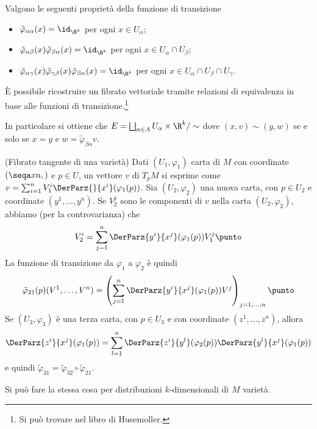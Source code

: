 \begin{proposition}
	Valgono le seguenti proprietà della funzione di transizione
	\begin{itemize}
	 \item $\tilde\varphi_{\alpha\alpha}(x)=\id_{\R^k}$ per ogni $x\in U_\alpha$;
	 \item $\tilde\varphi_{\alpha\beta}(x)\tilde\varphi_{\beta\alpha}(x) = \id_{\R^k}$ per ogni $x\in U_\alpha\cap U_\beta$;
	 \item $\tilde\varphi_{\alpha\gamma}(x) \tilde\varphi_{\gamma\beta}(x) \tilde\varphi_{\beta\alpha}(x) = \id_{\R^k}$ per ogni $x\in U_\alpha\cap U_\beta \cap U_\gamma$.
	\end{itemize}
\end{proposition}

\begin{remark}
	È possibile ricostruire un fibrato vettoriale tramite relazioni di equivalenza in base alle funzioni di transizione.\footnote{Si può trovare nel libro di Husemoller.}
	
	In particolare si ottiene che $E = \bigsqcup_{\alpha\in A} U_\alpha \times \R^k / \sim$ dove $(x,v)\sim (y,w)$ se e solo se $x=y$ e $w = \tilde\varphi_{\beta\alpha}v$.
\end{remark}

\begin{example} %
	(Fibrato tangente di una varietà) Dati $(U_1,\varphi_1)$ carta di $M$ con coordinate $(\seqa xn,)$ e $p\in U$, un vettore $v$ di $T_pM$ si esprime come $v = \sum_{i=1}^n V^i_1\DerParz{}{x^i}(\varphi_1(p))$. Sia $(U_2, \varphi_2)$ una nuova carta, con $p\in U_2$ e coordinate $(y^1,\dots, y^n)$.
	 Se $V^j_2$ sono le componenti di $v$ nella carta $(U_2,\varphi_2)$, abbiamo (per la controvarianza) che
	 \begin{equation*}
	 	V^i_2 = \sum_{j=1}^n \DerParz{y^i}{x^j}(\varphi_1(p))V^j_1\punto
	 \end{equation*}
	 La funzione di transizione da $\varphi_1$ a $\varphi_2$ è quindi
	 \begin{equation*}
	 \tilde\varphi_{21}(p)(V^1,\dots,V^n) = \left(\sum_{j=1}^n \DerParz{y^i}{x^j}(\varphi_1(p))V^j\right)_{j=1,\dots,n}\punto
	 \end{equation*}
	 Se $(U_3, \varphi_3)$ è una terza carta, con $p\in U_3$ e con coordinate $(z^1,\dots,z^n)$, allora
	 \begin{equation*}
	 	\DerParz{z^i}{x^j}(\varphi_1(p)) = \sum_{l=1}^n \DerParz{z^i}{y^l}(\varphi_2(p)) \DerParz{y^l}{x^j}(\varphi_1(p))  
	 \end{equation*}
	e quindi $\tilde\varphi_{31}=\tilde\varphi_{32}\circ \tilde\varphi_{21}$.
	
	Si può fare la stessa cosa per distribuzioni $k$-dimensionali di $M$ varietà.
	
\end{example}

